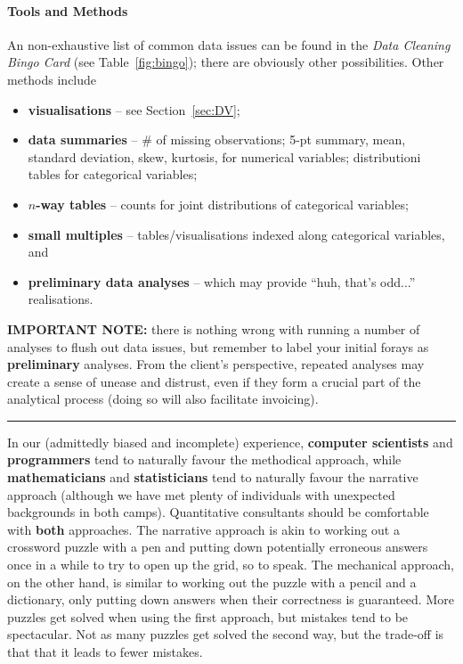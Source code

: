 \paragraph{Tools and Methods} An non-exhaustive list of common data issues can be found in the \textit{Data Cleaning Bingo Card} (see Table~\ref{fig:bingo}); there are obviously other possibilities. Other methods include 
\begin{itemize}[noitemsep]
\item \textbf{visualisations} -- see Section~\ref{sec:DV};
\item \textbf{data summaries} -- \# of missing observations; 5-pt summary, mean, standard deviation, skew, kurtosis, for numerical variables; distributioni tables for categorical variables; 
\item \textbf{$n$-way tables} -- counts for joint distributions of categorical variables;
\item \textbf{small multiples} -- tables/visualisations indexed along categorical variables, and
\item \textbf{preliminary data analyses} -- which may provide ``huh, that's odd...'' realisations.   
\end{itemize}
\textbf{IMPORTANT NOTE:} there is nothing wrong with running a number of analyses to flush out data issues, but remember to label your initial forays as \textbf{preliminary} analyses. From the client's perspective, repeated analyses may create a sense of unease and distrust, even if they form a crucial part of the analytical process (doing so will also facilitate invoicing). 
\begin{center}
    \rule{0.5\textwidth}{.4pt}
\end{center}
In our (admittedly biased and incomplete) experience, \textbf{computer scientists} and \textbf{programmers} tend to naturally favour the methodical approach, while \textbf{mathematicians} and \textbf{statisticians} tend to naturally favour the narrative approach (although we have met plenty of individuals with unexpected backgrounds in both camps). Quantitative consultants should be comfortable with \textbf{both} approaches. 
\newl The narrative approach is akin to working out a crossword puzzle with a pen and putting down potentially erroneous answers once in a while to try to open up the grid, so to speak. The mechanical approach, on the other hand, is similar to working out the puzzle with a pencil and a dictionary, only putting down answers when their correctness is guaranteed. More puzzles get solved when using the first approach, but mistakes tend to be spectacular. Not as many puzzles get solved the second way, but the trade-off is that that it leads to fewer mistakes. 
